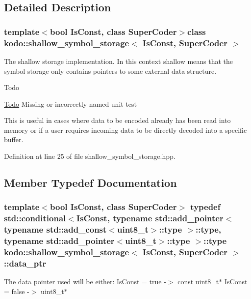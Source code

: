 \subsection{Detailed Description}
\subsubsection*{template$<$bool Is\-Const, class Super\-Coder$>$class kodo\-::shallow\-\_\-symbol\-\_\-storage$<$ Is\-Const, Super\-Coder $>$}

The shallow storage implementation. In this context shallow means that the symbol storage only contains pointers to some external data structure. 

\begin{DoxyRefDesc}{Todo}
\item[\hyperlink{todo__todo000056}{Todo}]Missing or incorrectly named unit test\end{DoxyRefDesc}
This is useful in cases where data to be encoded already has been read into memory or if a user requires incoming data to be directly decoded into a specific buffer. 

Definition at line 25 of file shallow\-\_\-symbol\-\_\-storage.\-hpp.



\subsection{Member Typedef Documentation}
\hypertarget{classkodo_1_1shallow__symbol__storage_ae30b89454fcd5e9d9afd516ffc103753}{
\subsubsection[{data\-\_\-ptr}]{\setlength{\rightskip}{0pt plus 5cm}template$<$bool Is\-Const, class Super\-Coder$>$ typedef std\-::conditional$<$Is\-Const, typename std\-::add\-\_\-pointer$<$ typename std\-::add\-\_\-const$<$uint8\-\_\-t$>$\-::type $>$\-::type, typename std\-::add\-\_\-pointer$<$uint8\-\_\-t$>$\-::type $>$\-::type {\bf kodo\-::shallow\-\_\-symbol\-\_\-storage}$<$ Is\-Const, Super\-Coder $>$\-::{\bf data\-\_\-ptr}}}\label{classkodo_1_1shallow__symbol__storage_ae30b89454fcd5e9d9afd516ffc103753}
The data pointer used will be either\-: Is\-Const = true -\/$>$ const uint8\-\_\-t$\ast$ Is\-Const = false -\/$>$ uint8\-\_\-t$\ast$ 

